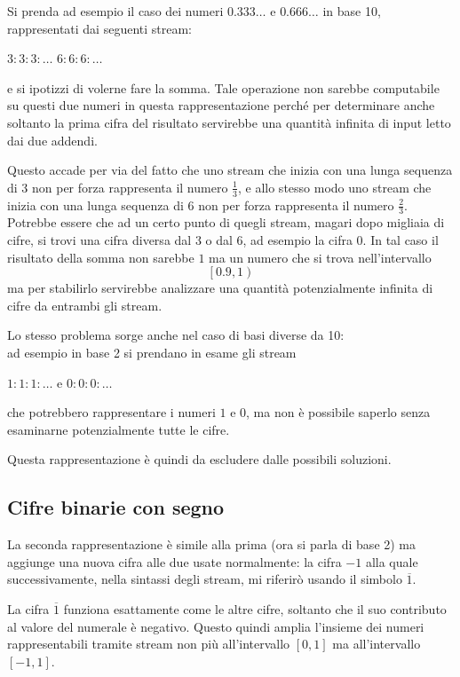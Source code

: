 \documentclass[Lau]{sapthesis}
\begin{document}
Si prenda ad esempio il caso dei numeri $0.333\ldots$ e $0.666\ldots$ in 
base 10, rappresentati dai seguenti stream:
\begin{center}
$3:3:3:\ldots$ \hspace{1cm} $6:6:6:\ldots$
\end{center}
e si ipotizzi di volerne fare la somma. Tale operazione non sarebbe computabile su questi due numeri in questa 
rappresentazione perché per determinare anche soltanto la prima cifra del 
risultato servirebbe una quantità infinita di input letto dai due addendi.

Questo accade per via del fatto che uno stream che inizia con una lunga sequenza 
di 3 non per forza rappresenta il numero $\frac{1}{3}$, e allo stesso modo uno 
stream che inizia con una lunga sequenza di 6 non per forza rappresenta il 
numero $\frac{2}{3}$. Potrebbe essere che 
ad un certo punto di quegli stream, magari dopo migliaia di cifre, si trovi una 
cifra diversa dal 3 o dal 6, ad esempio la cifra 0. In tal caso il risultato 
della somma 
non sarebbe $1$ ma un numero che si trova nell'intervallo
$$\left[0.9,1\right)$$
ma per stabilirlo servirebbe analizzare una quantità potenzialmente infinita di 
cifre da entrambi gli stream.

\medskip

Lo stesso problema sorge anche nel caso di basi diverse da 10:\\
ad esempio in base 2 si prendano in esame gli stream
\begin{center}
$1:1:1:\ldots$ \hspace{0.5cm} e \hspace{0.5cm} $0:0:0:\ldots$
\end{center}
che potrebbero rappresentare i numeri $1$ e $0$, ma non è possibile saperlo 
senza esaminarne potenzialmente tutte le cifre.

\medskip

Questa rappresentazione è quindi da escludere dalle possibili soluzioni.


\subsection{Cifre binarie con segno}
La seconda rappresentazione \cite{DavePlume} è simile alla prima (ora si parla di base 2) ma 
aggiunge una nuova cifra alle due usate normalmente: la cifra $-1$ alla quale 
successivamente, nella 
sintassi degli stream, mi riferirò usando il simbolo $\overline{1}$.

La cifra $\overline{1}$ funziona esattamente come le altre cifre, soltanto che 
il suo contributo al valore del numerale è negativo. Questo quindi amplia 
l'insieme dei numeri rappresentabili tramite stream non più all'intervallo 
$\left[0,1\right]$ ma all'intervallo $\left[-1,1\right]$.
\end{document}
